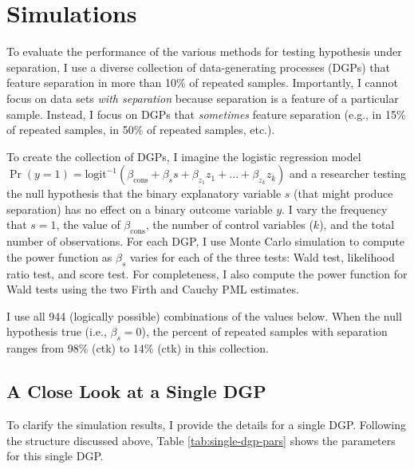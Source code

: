 \documentclass[
]{article}
\begin{document}
\hypertarget{simulations}{%
\section{Simulations}\label{simulations}}

To evaluate the performance of the various methods for testing
hypothesis under separation, I use a diverse collection of
data-generating processes (DGPs) that feature separation in more than
10\% of repeated samples. Importantly, I cannot focus on data sets
\emph{with separation} because separation is a feature of a particular
sample. Instead, I focus on DGPs that \emph{sometimes} feature
separation (e.g., in 15\% of repeated samples, in 50\% of repeated
samples, etc.).

To create the collection of DGPs, I imagine the logistic regression
model
\(\Pr(y = 1) = \text{logit}^{-1}(\beta_{\text{cons}} + \beta_s s + \beta_{z_1} z_1 + ... + \beta_{z_k} z_k)\)
and a researcher testing the null hypothesis that the binary explanatory
variable \(s\) (that might produce separation) has no effect on a binary
outcome variable \(y\). I vary the frequency that \(s = 1\), the value
of \(\beta_{\text{cons}}\), the number of control variables (\(k\)), and
the total number of observations. For each DGP, I use Monte Carlo
simulation to compute the power function as \(\beta_s\) varies for each
of the three tests: Wald test, likelihood ratio test, and score test.
For completeness, I also compute the power function for Wald tests using
the two Firth and Cauchy PML estimates.

I use all 944 (logically possible) combinations of the values below.
When the null hypothesis true (i.e., \(\beta_s = 0\)), the percent of
repeated samples with separation ranges from 98\% (ctk) to 14\% (ctk) in
this collection.

\hypertarget{a-close-look-at-a-single-dgp}{%
\subsection{A Close Look at a Single
DGP}\label{a-close-look-at-a-single-dgp}}

To clarify the simulation results, I provide the details for a single
DGP. Following the structure discussed above, Table
\ref{tab:single-dgp-pars} shows the parameters for this single DGP.
\end{document}
